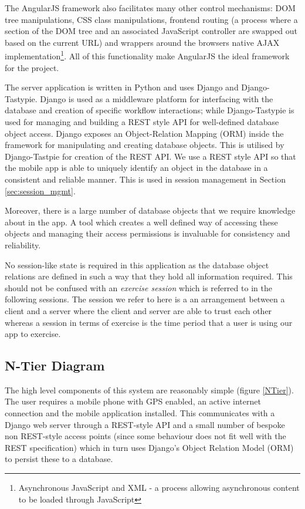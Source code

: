 The AngularJS framework also facilitates many other control
mechanisms: DOM tree manipulations, CSS class manipulations, frontend
routing (a process where a section of the DOM tree and an associated
JavaScript controller are swapped out based on the current URL) and
wrappers around the browsers native AJAX implementation\footnote{Asynchronous
JavaScript and XML - a process allowing asynchronous content to be
loaded through JavaScript}. All of this
functionality make AngularJS the ideal framework for the project. 

The server application is written in Python and uses Django\cite{django}
and Django-Tastypie\cite{tastypie}. Django is used as a middleware
platform for interfacing with the database and creation of specific
workflow interactions; while Django-Tastypie is used for managing and
building a REST style API for well-defined database object access.
Django exposes an Object-Relation Mapping (ORM) inside the framework
for manipulating and creating database objects. This is utilised by
Django-Tastpie for creation of the REST API. We use a REST style API
so that the mobile app is able to uniquely identify an object in the
database in a consistent and reliable manner. This is used in 
session management in Section \ref{sec:session_mgmt}.

Moreover, there is a large number of database objects that we require
knowledge about in the app. A tool which creates a well defined way of
accessing these objects and managing their access permissions is
invaluable for consistency and reliability.

No session-like state is required in this application as the database
object relations are defined in such a way that they hold all
information required. This should not be confused with an
\emph{exercise session} which is referred to in the following
sessions. The session we refer to here is a an arrangement between a
client and a server where the client and server are able to trust each
other whereas a session in terms of exercise is the time period that a
user is using our app to exercise.

\subsection{N-Tier Diagram}
The high level components of this system are reasonably simple (figure
\ref{NTier}). The
user requires a mobile phone with GPS enabled, an active internet
connection and the mobile application installed. This communicates
with a Django web server through a REST-style API and a small number of
bespoke non REST-style access points (since some behaviour does not
fit well with the REST specification) which in turn uses Django's
Object Relation Model (ORM) to persist these to a database.

